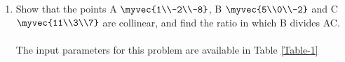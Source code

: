 \begin{abstract}\\
Through this manual, we will learn how to compute math problem using esp.
\end{abstract}

\begin{enumerate}[label=\thesection.\arabic*.,ref=\thesection.\theenumi]

	\item Show that the points A $\myvec{1\\-2\\-8}$, B $\myvec{5\\0\\-2}$ and C $\myvec{11\\3\\7}$ are collinear, and find the ratio in which B divides AC.\\


\solution \\The input parameters for this problem are available in Table \ref{Table-1}
\begin{table}[ht!]

\caption{}
\label{Table-1}	

\end{table}


\end{enumerate}
